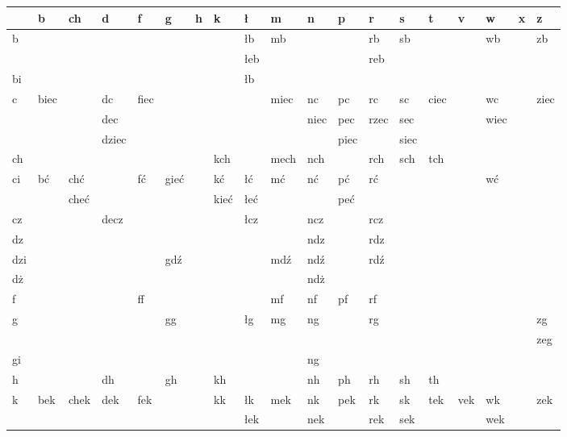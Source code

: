 \documentclass{article}
\begin{document}
\begin{longtable}{p{2mm}|p{2mm}p{4mm}p{2mm}p{1mm}p{3mm}p{2mm}p{3mm}p{2mm}p{4mm}p{3mm}p{3mm}p{2mm}p{2mm}p{2mm}p{1mm}p{1mm}p{1mm}p{4mm}}
 & b & ch & d & f & g & h & k & ł & m & n & p & r & s & t & v & w & x & z\\
\hline
b &  &  &  &  &  &  &  & łb & mb &  &  & rb & sb &  &  & wb &  & zb\\
 &  &  &  &  &  &  &  & łeb &  &  &  & reb &  &  &  &  &  & \\
\hline
bi &  &  &  &  &  &  &  & łb &  &  &  &  &  &  &  &  &  & \\
\hline
c & biec &  & dc & fiec &  &  &  &  & miec & nc & pc & rc & sc & ciec &  & wc &  & ziec\\
 &  &  & dec &  &  &  &  &  &  & niec & pec & rzec & sec &  &  & wiec &  & \\
 &  &  & dziec &  &  &  &  &  &  &  & piec &  & siec &  &  &  &  & \\
\hline
ch &  &  &  &  &  &  & kch &  & mech & nch &  & rch & sch & tch &  &  &  & \\
\hline
ci & bć & chć &  & fć & gieć &  & kć & łć & mć & nć & pć & rć &  &  &  & wć &  & \\
 &  & cheć &  &  &  &  & kieć & łeć &  &  & peć &  &  &  &  &  &  & \\
\hline
cz &  &  & decz &  &  &  &  & łcz &  & ncz &  & rcz &  &  &  &  &  & \\
\hline
dz &  &  &  &  &  &  &  &  &  & ndz &  & rdz &  &  &  &  &  & \\
\hline
dzi &  &  &  &  & gdź &  &  &  & mdź & ndź &  & rdź &  &  &  &  &  & \\
\hline
dż &  &  &  &  &  &  &  &  &  & ndż &  &  &  &  &  &  &  & \\
\hline
f &  &  &  & ff &  &  &  &  & mf & nf & pf & rf &  &  &  &  &  & \\
\hline
g &  &  &  &  & gg &  &  & łg & mg & ng &  & rg &  &  &  &  &  & zg\\
 &  &  &  &  &  &  &  &  &  &  &  &  &  &  &  &  &  & zeg\\
\hline
gi &  &  &  &  &  &  &  &  &  & ng &  &  &  &  &  &  &  & \\
\hline
h &  &  & dh &  & gh &  & kh &  &  & nh & ph & rh & sh & th &  &  &  & \\
\hline
k & bek & chek & dek & fek &  &  & kk & łk & mek & nk & pek & rk & sk & tek & vek & wk &  & zek\\
 &  &  &  &  &  &  &  & łek &  & nek &  & rek & sek &  &  & wek &  & \\

\end{longtable}
\end{document}
